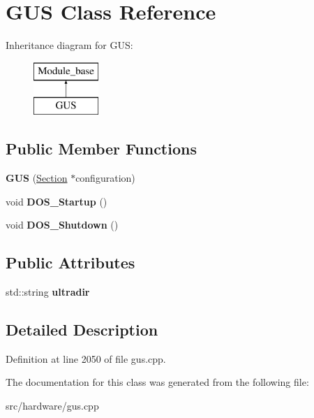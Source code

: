 \hypertarget{classGUS}{\section{G\-U\-S Class Reference}
\label{classGUS}
}
Inheritance diagram for G\-U\-S\-:\begin{figure}[H]
\begin{center}
\leavevmode
\includegraphics[height=2.000000cm]{classGUS}
\end{center}
\end{figure}
\subsection*{Public Member Functions}
\begin{DoxyCompactItemize}
\item 
\hypertarget{classGUS_a4ee14e2fc1aae1aef9cc6306d227dbf2}{{\bfseries G\-U\-S} (\hyperlink{classSection}{Section} $\ast$configuration)}\label{classGUS_a4ee14e2fc1aae1aef9cc6306d227dbf2}

\item 
\hypertarget{classGUS_aeb099ead25e3d56aeb70ecf72a85f14f}{void {\bfseries D\-O\-S\-\_\-\-Startup} ()}\label{classGUS_aeb099ead25e3d56aeb70ecf72a85f14f}

\item 
\hypertarget{classGUS_a36434682ec12dc37bd71575231bf287d}{void {\bfseries D\-O\-S\-\_\-\-Shutdown} ()}\label{classGUS_a36434682ec12dc37bd71575231bf287d}

\end{DoxyCompactItemize}
\subsection*{Public Attributes}
\begin{DoxyCompactItemize}
\item 
\hypertarget{classGUS_a3f1bfc9fabf97294cd24f1631368729a}{std\-::string {\bfseries ultradir}}\label{classGUS_a3f1bfc9fabf97294cd24f1631368729a}

\end{DoxyCompactItemize}


\subsection{Detailed Description}


Definition at line 2050 of file gus.\-cpp.



The documentation for this class was generated from the following file\-:\begin{DoxyCompactItemize}
\item 
src/hardware/gus.\-cpp\end{DoxyCompactItemize}
